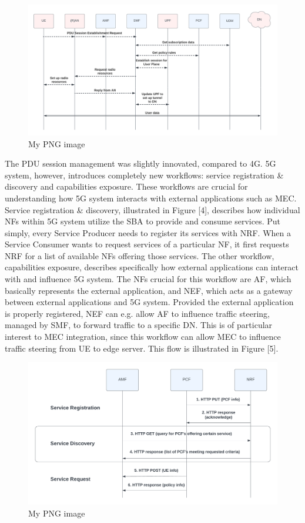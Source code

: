 \documentclass[12pt,a4paper,twoside]{report}
\begin{document}
\begin{figure}[ht]
	\centering
	\includegraphics[width=\textwidth]{./images/PDU-sesh-est.png}
	\caption{My PNG image}
\end{figure}

The PDU session management was slightly innovated, compared to 4G. 5G system, however, introduces completely new workflows: service registration \& discovery and capabilities exposure. These workflows are crucial for understanding how 5G system interacts with external applications such as MEC. Service registration \& discovery, illustrated in Figure [4], describes how individual NFs within 5G system utilize the SBA to provide and consume services. Put simply, every Service Producer needs to register its services with NRF. When a Service Consumer wants to request services of a particular NF, it first requests NRF for a list of available NFs offering those services. The other workflow, capabilities exposure, describes specifically how external applications can interact with and influence 5G system. The NFs crucial for this workflow are AF, which basically represents the external application, and NEF, which acts as a gateway between external applications and 5G system. Provided the external application is properly registered, NEF can e.g. allow AF to influence traffic steering, managed by SMF, to forward traffic to a specific DN. This is of particular interest to MEC integration, since this workflow can allow MEC to influence traffic steering from UE to edge server. This flow is illustrated in Figure [5].

\begin{figure}[ht]
	\centering
	\includegraphics[width=\textwidth]{./images/5G-reg-disc.png}
	\caption{My PNG image}
\end{figure}
\end{document}
